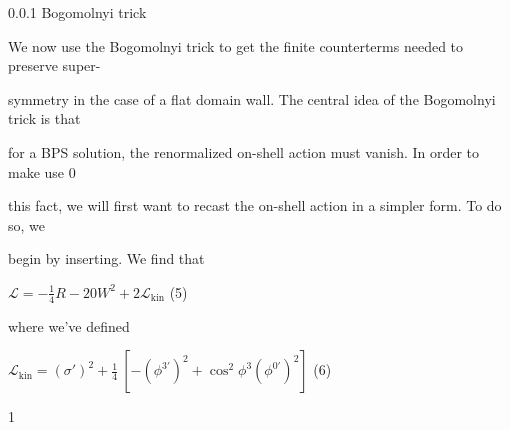 \documentclass[a4paper,12pt]{article}
\begin{document}
0.0.1 Bogomolnyi trick

We now use the Bogomolnyi trick to get the finite counterterms needed to preserve super-

symmetry in the case of a flat domain wall. The central idea of the Bogomolnyi trick is that

for a BPS solution, the renormalized on-shell action must vanish. In order to make use $0$

this fact, we will first want to recast the on-shell action in a simpler form. To do so, we

begin by inserting. We find that
\begin{center}
$\displaystyle \mathcal{L}=-\frac{1}{4}R-20W^{2}+2\mathcal{L}_{\mathrm{k}\mathrm{i}\mathrm{n}}$   (5)
\end{center}
where we've defined
\begin{center}
$\displaystyle \mathcal{L}_{\mathrm{k}\mathrm{i}\mathrm{n}}=(\sigma')^{2}+\frac{1}{4}\ [-(\phi^{3'})^{2}+\cos^{2}\phi^{3}(\phi^{0'})^{2}]$   (6)
\end{center}
1
\end{document}
